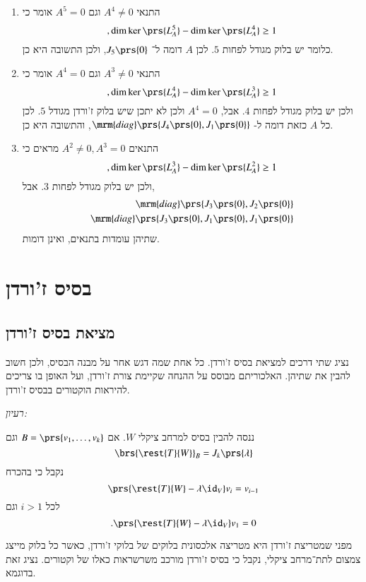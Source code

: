 \documentclass[a4paper,10pt,oneside,openany]{article}
\begin{document}
\begin{solution}
\begin{enumerate}
\item התנאי
$A^4 \neq 0$
וגם
$A^5 = 0$
אומר כי
\[\text{,}\dim \ker\prs{L_A^5} - \dim \ker\prs{L_A^4} \geq 1\]
כלומר יש בלוק מגודל לפחות
$5$.
לכן
$A$
דומה ל־%
$J_5\prs{0}$,
ולכן התשובה היא כן.
\item התנאי
$A^3 \neq 0$
וגם
$A^4 = 0$
אומר כי
\[\text{,} \dim \ker\prs{L_A^4} - \dim \ker\prs{L_A^3} \geq 1\]
ולכן יש בלוק מגודל לפחות
$4$.
אבל,
$A^4 = 0$
ולכן לא יתכן שיש בלוק ז'ורדן מגודל
$5$.
לכן כל
$A$
כזאת דומה ל-%
$\mrm{diag}\prs{J_4\prs{0}, J_1\prs{0}}$,
והתשובה היא כן.
\item התנאים
$A^2 \neq 0, A^3 = 0$
מראים כי
\[\text{,} \dim \ker\prs{L_A^3} - \dim \ker\prs{L_A^2} \geq 1\]
ולכן יש בלוק מגודל לפחות
$3$.
אבל,
\begin{align*}
\mrm{diag}\prs{J_3\prs{0}, J_2\prs{0}} \\
\mrm{diag}\prs{J_3\prs{0}, J_1\prs{0}, J_1\prs{0}}
\end{align*}
שתיהן עומדות בתנאים, ואינן דומות.
\end{enumerate}
\end{solution}

\section{בסיס ז'ורדן}

\subsection{מציאת בסיס ז'ורדן}

נציג שתי דרכים למציאת בסיס ז'ורדן. כל אחת שמה דגש אחר על מבנה הבסיס, ולכן חשוב להבין את שתיהן.
האלכוריתם מבוסס על ההנחה שקיימת צורת ז'ורדן, ועל האופן בו צריכים להיראות הוקטורים בבסיס ז'ורדן.

\emph{רעיון:}

ננסה להבין בסיס למרחב ציקלי
$W$.
אם
$B = \prs{v_1, \ldots, v_k}$
וגם
\[\brs{\rest{T}{W}}_B = J_k\prs{\lambda}\]
נקבל כי בהכרח
\[\prs{\rest{T}{W} - \lambda \id_V} v_i = v_{i-1}\]
לכל
$i > 1$
וגם
\[\text{.} \prs{\rest{T}{W} - \lambda \id_V} v_1 = 0\]

מפני שמטריצת ז'ורדן היא מטריצה אלכסונית בלוקים של בלוקי ז'ורדן, כאשר כל בלוק מייצג צמצום לתת־מרחב ציקלי, נקבל כי בסיס ז'ורדן מורכב משרשראות כאלו של וקטורים.
נציג זאת בדוגמא.
\end{document}
